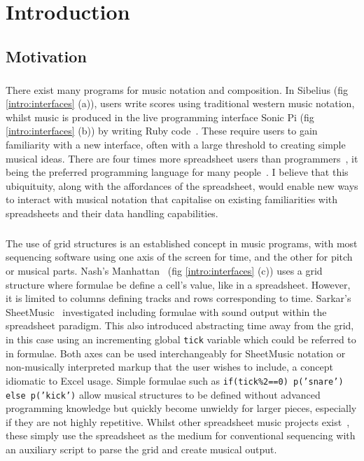 
\chapter{Introduction}

\section{Motivation}

\paragraph{} There exist many programs for music notation and composition. In Sibelius (fig \ref{intro:interfaces} (a)), users write scores using traditional western music notation, whilst music is produced in the live programming interface Sonic Pi (fig \ref{intro:interfaces} (b)) by writing Ruby code~\cite{aaron:pi}. These require users to gain familiarity with a new interface, often with a large threshold to creating simple musical ideas. There are four times more spreadsheet users than programmers~\cite{scaffidi:estimating}, it being the preferred programming language for many people~\cite{blackwell:functions}. I believe that this ubiquituity, along with the affordances of the spreadsheet, would enable new ways to interact with musical notation that capitalise on existing familiarities with spreadsheets and their data handling capabilities.

\paragraph{} The use of grid structures is an established concept in music programs, with most sequencing software using one axis of the screen for time, and the other for pitch or musical parts. Nash's Manhattan~\cite{nash:manhattan} (fig \ref{intro:interfaces} (c)) uses a grid structure where formulae be define a cell's value, like in a spreadsheet. However, it is limited to columns defining tracks and rows corresponding to time. Sarkar's SheetMusic~\cite{sarkar:sheetmusic} investigated including formulae with sound output within the spreadsheet paradigm. This also introduced abstracting time away from the grid, in this case using an incrementing global \texttt{tick} variable which could be referred to in formulae. Both axes can be used interchangeably for SheetMusic notation or non-musically interpreted markup that the user wishes to include, a concept idiomatic to Excel usage. Simple formulae such as \texttt{if(tick\%2==0) p('snare') else p('kick')} allow musical structures to be defined without advanced programming knowledge but quickly become unwieldy for larger pieces, especially if they are not highly repetitive. Whilst other spreadsheet music projects exist~\cite{hackaday:spreadsheet}, these simply use the spreadsheet as the medium for conventional sequencing with an auxiliary script to parse the grid and create musical output.

